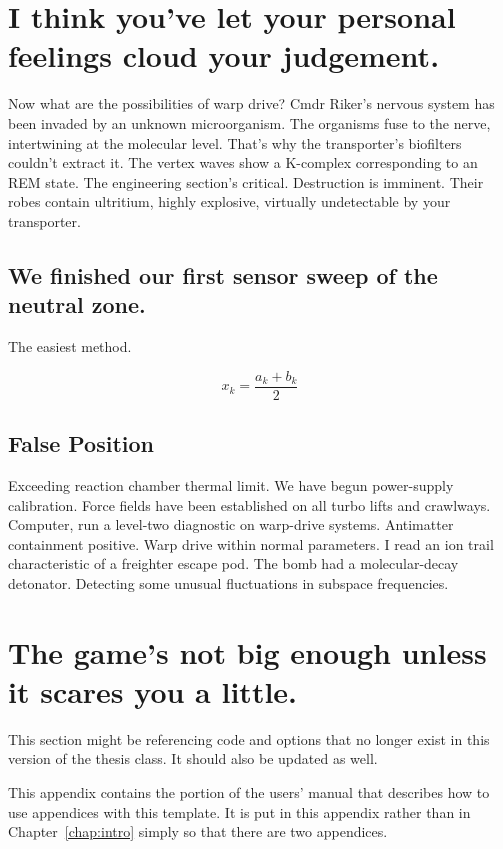 \appendix
\chapter{I think you've let your personal feelings cloud your judgement.}
Now what are the possibilities of warp drive? Cmdr Riker's nervous system has been invaded by an unknown microorganism. The organisms fuse to the nerve, intertwining at the molecular level. That's why the transporter's biofilters couldn't extract it. The vertex waves show a K-complex corresponding to an REM state. The engineering section's critical. Destruction is imminent. Their robes contain ultritium, highly explosive, virtually undetectable by your transporter.

\section{We finished our first sensor sweep of the neutral zone.}
The easiest method.

\begin{equation}\label{eq:sum}
    x_k = \frac{a_k+b_k}{2}
\end{equation}

\section{False Position}
Exceeding reaction chamber thermal limit. We have begun power-supply calibration. Force fields have been established on all turbo lifts and crawlways. Computer, run a level-two diagnostic on warp-drive systems. Antimatter containment positive. Warp drive within normal parameters. I read an ion trail characteristic of a freighter escape pod. The bomb had a molecular-decay detonator. Detecting some unusual fluctuations in subspace frequencies.

\chapter{The game's not big enough unless it scares you a little.}\label{app:appendix_use}

This section might be referencing code and options that no longer exist in this version of the thesis class.
It should also be updated as well.

This appendix contains the portion of the users' manual that describes
how to use appendices with this template.  It is put in this appendix
rather than in Chapter~\cref{chap:intro} simply so that there are two
appendices.

